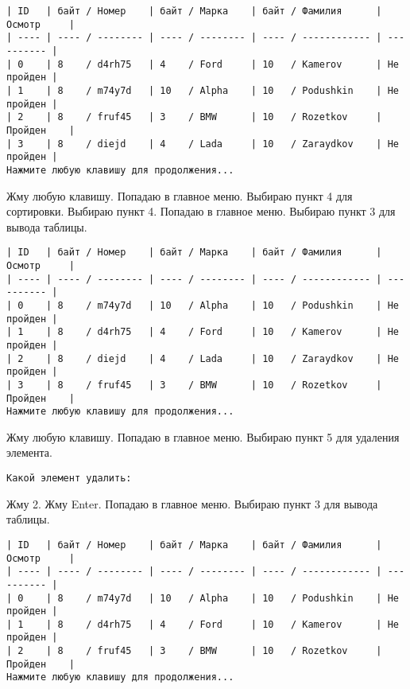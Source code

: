 \begin{tcolorbox}
\begin{verbatim}
| ID   | байт / Номер    | байт / Марка    | байт / Фамилия      | Осмотр     |
| ---- | ---- / -------- | ---- / -------- | ---- / ------------ | ---------- |
| 0    | 8    / d4rh75   | 4    / Ford     | 10   / Kamerov      | Не пройден |
| 1    | 8    / m74y7d   | 10   / Alpha    | 10   / Podushkin    | Не пройден |
| 2    | 8    / fruf45   | 3    / BMW      | 10   / Rozetkov     | Пройден    |
| 3    | 8    / diejd    | 4    / Lada     | 10   / Zaraydkov    | Не пройден |
Нажмите любую клавишу для продолжения...
\end{verbatim}
\end{tcolorbox}

Жму любую клавишу. Попадаю в главное меню. Выбираю пункт 4 для сортировки. Выбираю пункт 4. Попадаю в главное меню. Выбираю пункт 3 для вывода таблицы.

\begin{tcolorbox}
\begin{verbatim}
| ID   | байт / Номер    | байт / Марка    | байт / Фамилия      | Осмотр     |
| ---- | ---- / -------- | ---- / -------- | ---- / ------------ | ---------- |
| 0    | 8    / m74y7d   | 10   / Alpha    | 10   / Podushkin    | Не пройден |
| 1    | 8    / d4rh75   | 4    / Ford     | 10   / Kamerov      | Не пройден |
| 2    | 8    / diejd    | 4    / Lada     | 10   / Zaraydkov    | Не пройден |
| 3    | 8    / fruf45   | 3    / BMW      | 10   / Rozetkov     | Пройден    |
Нажмите любую клавишу для продолжения...
\end{verbatim}
\end{tcolorbox}

Жму любую клавишу. Попадаю в главное меню. Выбираю пункт 5 для удаления элемента.

\begin{tcolorbox}
\begin{verbatim}
Какой элемент удалить:
\end{verbatim}
\end{tcolorbox}

Жму 2. Жму Enter. Попадаю в главное меню. Выбираю пункт 3 для вывода таблицы.

\begin{tcolorbox}
\begin{verbatim}
| ID   | байт / Номер    | байт / Марка    | байт / Фамилия      | Осмотр     |
| ---- | ---- / -------- | ---- / -------- | ---- / ------------ | ---------- |
| 0    | 8    / m74y7d   | 10   / Alpha    | 10   / Podushkin    | Не пройден |
| 1    | 8    / d4rh75   | 4    / Ford     | 10   / Kamerov      | Не пройден |
| 2    | 8    / fruf45   | 3    / BMW      | 10   / Rozetkov     | Пройден    |
Нажмите любую клавишу для продолжения...
\end{verbatim}
\end{tcolorbox}

